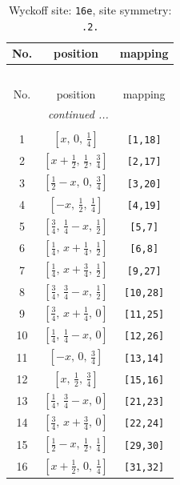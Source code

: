 \documentclass[fleqn,8pt]{jsarticle}
\begin{document}
\renewcommand{\arraystretch}{1.2}
\begin{longtable}{ccc}
\caption{Wyckoff site: {\tt 16e}, site symmetry: {\tt .2.}}
 \\
 \hline \hline
No. & position & mapping \\ \hline \endfirsthead

\multicolumn{2}{l}{\tablename\ \thetable{}} \\
 \hline \hline
No. & position & mapping \\ \hline \endhead

 \hline \hline
\multicolumn{2}{r}{\footnotesize\it continued ...} \\ \endfoot

 \hline \hline
\multicolumn{2}{r}{} \\ \endlastfoot

1 & $\left[ x,\, 0,\, \frac{1}{4} \right]$ & {\tt [1,18]} \\ \hline
2 & $\left[ x + \frac{1}{2},\, \frac{1}{2},\, \frac{3}{4} \right]$ & {\tt [2,17]} \\ \hline
3 & $\left[ \frac{1}{2} - x,\, 0,\, \frac{3}{4} \right]$ & {\tt [3,20]} \\ \hline
4 & $\left[ - x,\, \frac{1}{2},\, \frac{1}{4} \right]$ & {\tt [4,19]} \\ \hline
5 & $\left[ \frac{3}{4},\, \frac{1}{4} - x,\, \frac{1}{2} \right]$ & {\tt [5,7]} \\ \hline
6 & $\left[ \frac{1}{4},\, x + \frac{1}{4},\, \frac{1}{2} \right]$ & {\tt [6,8]} \\ \hline
7 & $\left[ \frac{1}{4},\, x + \frac{3}{4},\, \frac{1}{2} \right]$ & {\tt [9,27]} \\ \hline
8 & $\left[ \frac{3}{4},\, \frac{3}{4} - x,\, \frac{1}{2} \right]$ & {\tt [10,28]} \\ \hline
9 & $\left[ \frac{3}{4},\, x + \frac{1}{4},\, 0 \right]$ & {\tt [11,25]} \\ \hline
10 & $\left[ \frac{1}{4},\, \frac{1}{4} - x,\, 0 \right]$ & {\tt [12,26]} \\ \hline
11 & $\left[ - x,\, 0,\, \frac{3}{4} \right]$ & {\tt [13,14]} \\ \hline
12 & $\left[ x,\, \frac{1}{2},\, \frac{3}{4} \right]$ & {\tt [15,16]} \\ \hline
13 & $\left[ \frac{1}{4},\, \frac{3}{4} - x,\, 0 \right]$ & {\tt [21,23]} \\ \hline
14 & $\left[ \frac{3}{4},\, x + \frac{3}{4},\, 0 \right]$ & {\tt [22,24]} \\ \hline
15 & $\left[ \frac{1}{2} - x,\, \frac{1}{2},\, \frac{1}{4} \right]$ & {\tt [29,30]} \\ \hline
16 & $\left[ x + \frac{1}{2},\, 0,\, \frac{1}{4} \right]$ & {\tt [31,32]} \\
\end{longtable}
\end{document}
